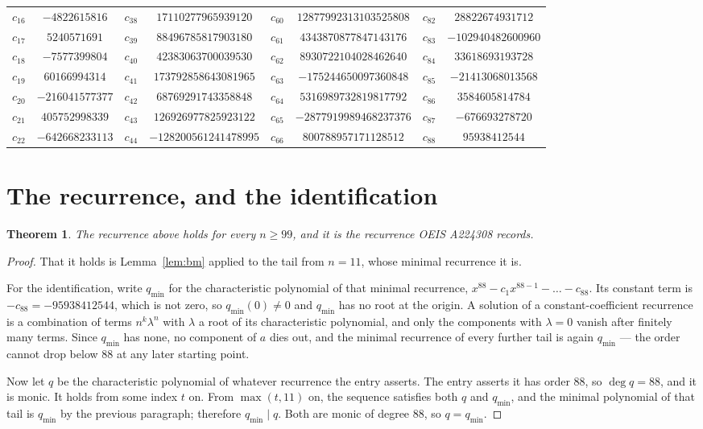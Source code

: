 \documentclass[11pt,a4paper]{article}
\theoremstyle{plain}
\newtheorem{theorem}{Theorem}
\theoremstyle{definition}
\begin{document}
\begin{center}
\begin{tabular}{cccccccc}
$c_{16}$ & $-4822615816$ & $c_{38}$ & $17110277965939120$ & $c_{60}$ & $12877992313103525808$ & $c_{82}$ & $28822674931712$ \\
$c_{17}$ & $5240571691$ & $c_{39}$ & $88496785817903180$ & $c_{61}$ & $4343870877847143176$ & $c_{83}$ & $-102940482600960$ \\
$c_{18}$ & $-7577399804$ & $c_{40}$ & $42383063700039530$ & $c_{62}$ & $8930722104028462640$ & $c_{84}$ & $33618693193728$ \\
$c_{19}$ & $60166994314$ & $c_{41}$ & $173792858643081965$ & $c_{63}$ & $-175244650097360848$ & $c_{85}$ & $-21413068013568$ \\
$c_{20}$ & $-216041577377$ & $c_{42}$ & $68769291743358848$ & $c_{64}$ & $5316989732819817792$ & $c_{86}$ & $3584605814784$ \\
$c_{21}$ & $405752998339$ & $c_{43}$ & $126926977825923122$ & $c_{65}$ & $-2877919989468237376$ & $c_{87}$ & $-676693278720$ \\
$c_{22}$ & $-642668233113$ & $c_{44}$ & $-128200561241478995$ & $c_{66}$ & $800788957171128512$ & $c_{88}$ & $95938412544$ \\
\end{tabular}
\end{center}

\section{The recurrence, and the identification}

\begin{theorem}
The recurrence above holds for every $n\ge99$, and it is the recurrence OEIS A224308 records.
\end{theorem}

\begin{proof}
That it holds is Lemma~\ref{lem:bm} applied to the tail from $n=11$, whose minimal
recurrence it is.

For the identification, write $q_{\min}$ for the characteristic polynomial of that minimal
recurrence, $x^{88}-c_1x^{88-1}-\dots-c_{88}$. Its constant term is
$-c_{88}=-95938412544$, which is not zero, so $q_{\min}(0)\neq0$ and $q_{\min}$ has no
root at the origin. A solution of a constant-coefficient recurrence is a combination of terms
$n^{k}\lambda^{n}$ with $\lambda$ a root of its characteristic polynomial, and only the
components with $\lambda=0$ vanish after finitely many terms. Since $q_{\min}$ has none, no
component of $a$ dies out, and the minimal recurrence of every further tail is again
$q_{\min}$ --- the order cannot drop below $88$ at any later starting point.

Now let $q$ be the characteristic polynomial of whatever recurrence the entry asserts. The
entry asserts it has order $88$, so $\deg q=88$, and it is monic. It holds from some
index $t$ on. From $\max(t,11)$ on, the sequence satisfies both $q$ and $q_{\min}$, and
the minimal polynomial of that tail is $q_{\min}$ by the previous paragraph; therefore
$q_{\min}\mid q$. Both are monic of degree $88$, so $q=q_{\min}$.
\end{proof}
\end{document}
